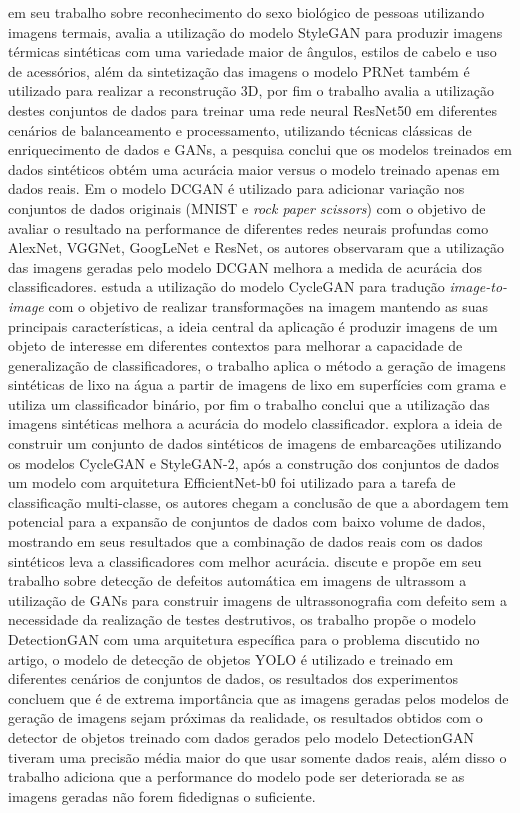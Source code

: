  em seu trabalho sobre reconhecimento do sexo biológico de pessoas utilizando imagens termais, avalia a utilização do modelo StyleGAN para produzir imagens térmicas sintéticas com uma variedade maior de ângulos, estilos de cabelo e uso de acessórios, além da sintetização das imagens o modelo PRNet também é utilizado para realizar a reconstrução 3D, por fim o trabalho avalia a utilização destes conjuntos de dados para treinar uma rede neural ResNet50 em diferentes cenários de balanceamento e processamento, utilizando técnicas clássicas de enriquecimento de dados e GANs, a pesquisa conclui que os modelos treinados em dados sintéticos obtém uma acurácia maior versus o modelo treinado apenas em dados reais.
Em  o modelo DCGAN é utilizado para adicionar variação nos conjuntos de dados originais (MNIST e \textit{rock paper scissors}) com o objetivo de avaliar o resultado na performance de diferentes redes neurais profundas como AlexNet, VGGNet, GoogLeNet e ResNet, os autores observaram que a utilização das imagens geradas pelo modelo DCGAN melhora a medida de acurácia dos classificadores.
 estuda a utilização do modelo CycleGAN para tradução \textit{image-to-image} com o objetivo de realizar transformações na imagem mantendo as suas principais características, a ideia central da aplicação é produzir imagens de um objeto de interesse em diferentes contextos para melhorar a capacidade de generalização de classificadores, o trabalho aplica o método a geração de imagens sintéticas de lixo na água a partir de imagens de lixo em superfícies com grama e utiliza um classificador binário, por fim o trabalho conclui que a utilização das imagens sintéticas melhora a acurácia do modelo classificador.
 explora a ideia de construir um conjunto de dados sintéticos de imagens de embarcações utilizando os modelos CycleGAN e StyleGAN-2, após a construção dos conjuntos de dados um modelo com arquitetura EfficientNet-b0 foi utilizado para a tarefa de classificação multi-classe, os autores chegam a conclusão de que a abordagem tem potencial para a expansão de conjuntos de dados com baixo volume de dados, mostrando em seus resultados que a combinação de dados reais com os dados sintéticos leva a classificadores com melhor acurácia.
 discute e propõe em seu trabalho sobre detecção de defeitos automática em imagens de ultrassom a utilização de GANs para construir imagens de ultrassonografia com defeito sem a necessidade da realização de testes destrutivos, os trabalho propõe o modelo DetectionGAN com uma arquitetura específica para o problema discutido no artigo, o modelo de detecção de objetos YOLO é utilizado e treinado em diferentes cenários de conjuntos de dados, os resultados dos experimentos concluem que é de extrema importância que as imagens geradas pelos modelos de geração de imagens sejam próximas da realidade, os resultados obtidos com o detector de objetos treinado com dados gerados pelo modelo DetectionGAN tiveram uma precisão média maior do que usar somente dados reais, além disso o trabalho adiciona que a performance do modelo pode ser deteriorada se as imagens geradas não forem fidedignas o suficiente.
